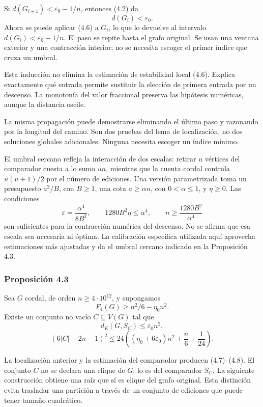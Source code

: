 \documentclass[spanish,11pt,a4paper]{article}
\begin{document}
Si \(d(G_{i+1})<\varepsilon_0-1/n\), entonces (4.2) da \[
d(G_i)<\varepsilon_0.
\] Ahora se puede aplicar (4.6) a \(G_i\), lo que lo devuelve al intervalo \(d(G_i)<\varepsilon_0-1/n\). El paso se repite hasta el grafo original. Se usan una ventana exterior y una contracción interior; no se necesita escoger el primer índice que cruza un umbral.

Esta inducción no elimina la estimación de estabilidad local (4.6). Explica exactamente qué entrada permite sustituir la elección de primera entrada por un descenso. La monotonía del valor fraccional preserva las hipótesis numéricas, aunque la distancia oscile.

La misma propagación puede demostrarse eliminando el último paso y razonando por la longitud del camino. Son dos pruebas del lema de localización, no dos soluciones globales adicionales. Ninguna necesita escoger un índice mínimo.

El umbral cercano refleja la interacción de dos escalas: retirar \(u\) vértices del comparador cuesta a lo sumo \(un\), mientras que la cuenta cordal controla \(u(u+1)/2\) por el número de ediciones. Una versión parametrizada toma un presupuesto \(a^2/B\), con \(B\ge1\), una cota \(a\ge\alpha n\), con \(0<\alpha\le1\), y \(\eta\ge0\). Las condiciones \[
\varepsilon=\frac{\alpha^4}{8B^2},\qquad
1280B^2\eta\le\alpha^4,\qquad
n\ge\frac{1280B^2}{\alpha^4}
\] son suficientes para la contracción numérica del descenso. No se afirma que esa escala sea necesaria ni óptima. La calibración específica utilizada aquí aprovecha estimaciones más ajustadas y da el umbral cercano indicado en la Proposición 4.3.

\subsubsection{Proposición 4.3}\label{proposicion-4.3}

Sea \(G\) cordal, de orden \(n\ge4\cdot10^{12}\), y supongamos \[
F_4(G)\ge n^2/6-\eta_0n^2.
\] Existe un conjunto no vacío \(C\subseteq V(G)\) tal que \[
d_E(G,S_C)\le\varepsilon_0n^2,
\tag{4.7}
\] \[
(6|C|-2n-1)^2
\le24\left((\eta_0+6\varepsilon_0)n^2+\frac n6+\frac1{24}\right).
\tag{4.8}
\]

La localización anterior y la estimación del comparador producen (4.7)--(4.8). El conjunto \(C\) no se declara una clique de \(G\): lo es del comparador \(S_C\). La siguiente construcción obtiene una raíz que sí es clique del grafo original. Esta distinción evita trasladar una partición a través de un conjunto de ediciones que puede tener tamaño cuadrático.
\end{document}
